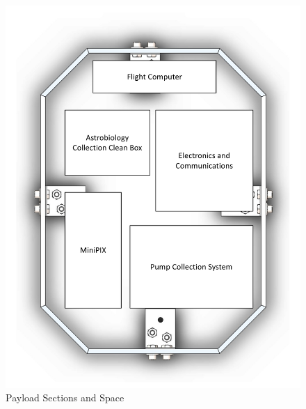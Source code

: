 \begin{figure}[H]
    \begin{center}
        \includegraphics[width=60 mm, scale=1]{figures/payload_sections.pdf}
        \caption{Payload Sections and Space}
        \label{fig:payload_sec}
    \end{center}
\end{figure}
%
